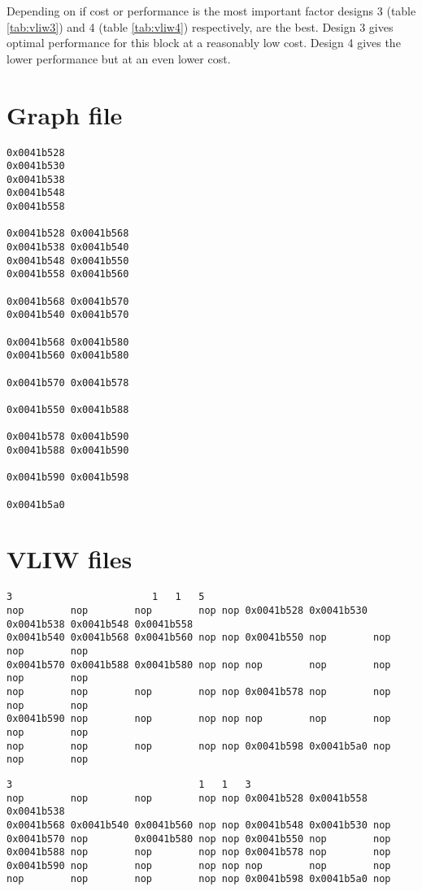 \documentclass[titlepage, a4paper]{article}
\begin{document}
Depending on if cost or performance is the most important factor designs 3 (table \ref{tab:vliw3}) and 4 (table \ref{tab:vliw4}) respectively, are the best. Design 3 gives optimal performance for this block at a reasonably low cost. Design 4 gives the lower performance but at an even lower cost.

\newpage
\appendix

\section{Graph file}\label{app:graph}
\begin{lstlisting}
0x0041b528
0x0041b530
0x0041b538
0x0041b548
0x0041b558

0x0041b528 0x0041b568
0x0041b538 0x0041b540
0x0041b548 0x0041b550
0x0041b558 0x0041b560

0x0041b568 0x0041b570
0x0041b540 0x0041b570

0x0041b568 0x0041b580
0x0041b560 0x0041b580

0x0041b570 0x0041b578

0x0041b550 0x0041b588

0x0041b578 0x0041b590
0x0041b588 0x0041b590

0x0041b590 0x0041b598

0x0041b5a0
\end{lstlisting}
\newpage

\section{VLIW files}
\begin{lstlisting}[caption=VLIW 1, basicstyle=\tiny]
3          		         1   1   5
nop        nop        nop        nop nop 0x0041b528 0x0041b530 0x0041b538 0x0041b548 0x0041b558
0x0041b540 0x0041b568 0x0041b560 nop nop 0x0041b550 nop        nop        nop        nop
0x0041b570 0x0041b588 0x0041b580 nop nop nop        nop        nop        nop        nop
nop        nop        nop        nop nop 0x0041b578 nop        nop        nop        nop
0x0041b590 nop        nop        nop nop nop        nop        nop        nop        nop
nop        nop        nop        nop nop 0x0041b598 0x0041b5a0 nop        nop        nop
\end{lstlisting}

\begin{lstlisting}[caption=VLIW 2, basicstyle=\tiny]
3                                1   1   3
nop        nop        nop        nop nop 0x0041b528 0x0041b558 0x0041b538
0x0041b568 0x0041b540 0x0041b560 nop nop 0x0041b548 0x0041b530 nop
0x0041b570 nop        0x0041b580 nop nop 0x0041b550 nop        nop
0x0041b588 nop        nop        nop nop 0x0041b578 nop        nop
0x0041b590 nop        nop        nop nop nop        nop        nop
nop        nop        nop        nop nop 0x0041b598 0x0041b5a0 nop
\end{lstlisting}
\end{document}
